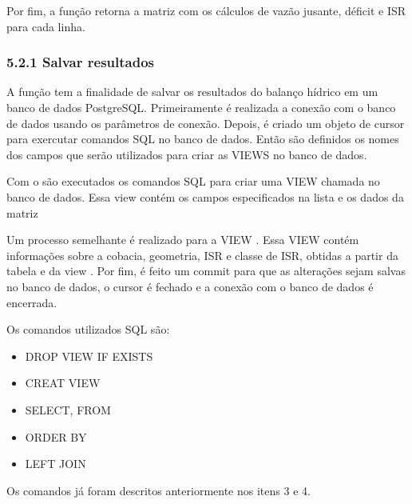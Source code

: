 \documentclass[a4paper,10pt,brazil]{sphinxmanual}
\begin{document}
\sphinxAtStartPar
Por fim, a função retorna a matriz com os cálculos de vazão jusante, déficit e ISR para cada linha.


\subsubsection{5.2.1 Salvar resultados}
\label{\detokenize{5calculoBalanco:salvar-resultados}}
\sphinxAtStartPar
A função  tem a finalidade de salvar os resultados do balanço hídrico em um banco de dados PostgreSQL. Primeiramente é realizada a conexão com o banco de dados usando os parâmetros de conexão. Depois, é criado um objeto de cursor para exercutar comandos SQL no banco de dados. Então são definidos os nomes dos campos que serão utilizados para criar as VIEWS no banco de dados.

\sphinxAtStartPar
Com o  são executados os comandos SQL para criar uma VIEW chamada  no banco de dados. Essa view contém os campos especificados na lista  e os dados da matriz 

\sphinxAtStartPar
Um processo semelhante é realizado para a VIEW . Essa VIEW contém informações sobre a cobacia, geometria, ISR e classe de ISR, obtidas a partir da tabela  e da view . Por fim, é feito um commit para que as alterações sejam salvas no banco de dados, o cursor é fechado e a conexão com o banco de dados é encerrada.

\sphinxAtStartPar
Os comandos utilizados SQL são:
\begin{itemize}
\item {} 
\sphinxAtStartPar
DROP VIEW IF EXISTS

\item {} 
\sphinxAtStartPar
CREAT VIEW

\item {} 
\sphinxAtStartPar
SELECT, FROM

\item {} 
\sphinxAtStartPar
ORDER BY

\item {} 
\sphinxAtStartPar
LEFT JOIN

\end{itemize}

\sphinxAtStartPar
Os comandos já foram descritos anteriormente nos itens 3 e 4.
\end{document}
